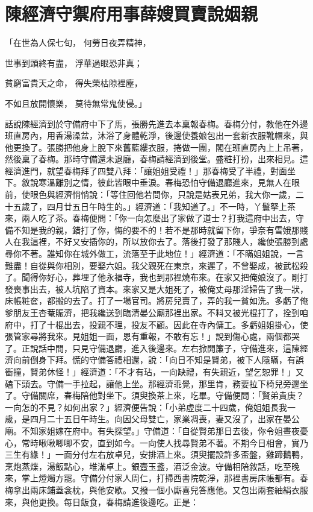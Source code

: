 %

\chapter{陳經濟守禦府用事\KG 薛嫂買賣說姻親}


「在世為人保七旬，  何勞日夜弄精神，

世事到頭終有盡，  浮華過眼恐非真；

貧窮富貴天之命，  得失榮枯隙裡塵，

不如且放開懷樂，  莫待無常鬼使侵。」

話說陳經濟到於守備府中下了馬，張勝先進去本稟報春梅。春梅分付，教他在外邊班直房內，用香湯澡盆，沐浴了身體乾淨，後邊使養娘包出一套新衣服靴帽來，與他更換了。張勝把他身上脫下來舊藍縷衣服，捲做一團，閣在班直房內上上吊著，然後稟了春梅。那時守備還未退廳，春梅請經濟到後堂。盛粧打扮，出來相見。這經濟進門，就望春梅拜了四雙八拜：「讓姐姐受禮！」那春梅受了半禮，對面坐下。敘說寒溫離別之情，彼此皆眼中垂淚。春梅恐怕守備退廳進來，見無人在眼前，使眼色與經濟悄悄說：「等住回他若問你，只說是姑表兄弟，我大你一歲，二十五歲了，四月廿五日午時生的。」經濟道：「我知道了。」不一時，丫鬟拏上茶來，兩人吃了茶。春梅便問：「你一向怎麼出了家做了道士？打我這府中出去，守備不知是我的親，錯打了你，悔的要不的！若不是那時就留下你，爭奈有雪娥那賤人在我這裡，不好又安插你的，所以放你去了。落後打發了那賤人，纔使張勝到處尋你不著。誰知你在城外做工，流落至于此地位！」經濟道：「不瞞姐姐說，一言難盡！自從與你相別，要娶六姐。我父親死在東京，來遲了，不曾娶成，被武松殺了。聞得你好心，葬埋了他永福寺，我也到那裡燒布來。在家又把俺娘沒了。剛打發喪事出去，被人坑陷了資本。來家又是大姐死了，被俺丈母那淫婦告了我一狀，床帳粧奩，都搬的去了。打了一場官司。將房兒賣了，弄的我一貧如洗。多虧了俺爹朋友王杏菴賑濟，把我纔送到臨清晏公廟那裡出家。不料又被光棍打了，拴到咱府中，打了十棍出去，投親不理，投友不顧。因此在寺內傭工。多虧姐姐掛心，使張管家尋將我來。見姐姐一面，恩有重報，不敢有忘！」說到傷心處，兩個都哭了。正說話中間，只見守備退廳，進入後邊來。左右掀開簾子，守備進來，這陳經濟向前倒身下拜。慌的守備答禮相還，說：「向日不知是賢弟，被下人隱瞞，有誤衝撞，賢弟休怪！」經濟道：「不才有玷，一向缺禮，有失親近，望乞恕罪！」又磕下頭去。守備一手拉起，讓他上坐。那經濟乖覺，那里肯，務要拉下椅兒旁邊坐了。守備關席，春梅陪他對坐下。須臾換茶上來，吃畢。守備便問：「賢弟貴庚？一向怎的不見？如何出家？」經濟便告說：「小弟虛度二十四歲，俺姐姐長我一歲，是四月二十五日午時生。向因父母雙亡，家業凋喪，妻又沒了，出家在晏公廟。不知家姐嫁在府中。有失探望。」守備道：「自從賢弟那日去後，你令姐晝夜憂心，常時啾啾唧唧不安，直到如今。一向使人找尋賢弟不著。不期今日相會，實乃三生有緣！」一面分付左右放卓兒，安排酒上來。須臾擺設許多盃盤，雞蹄鵝鴨，烹炮蒸煠，湯飯點心，堆滿卓上。銀壼玉盞，酒泛金波。守備相陪敘話，吃至晚來，掌上燈燭方罷。守備分付家人周仁，打掃西書院乾淨，那裡書房床帳都有。春梅拿出兩床鋪蓋衾枕，與他安歇。又撥一個小廝喜兒答應他。又包出兩套紬絹衣服來，與他更換。每日飯食，春梅請進後邊吃。正是：

